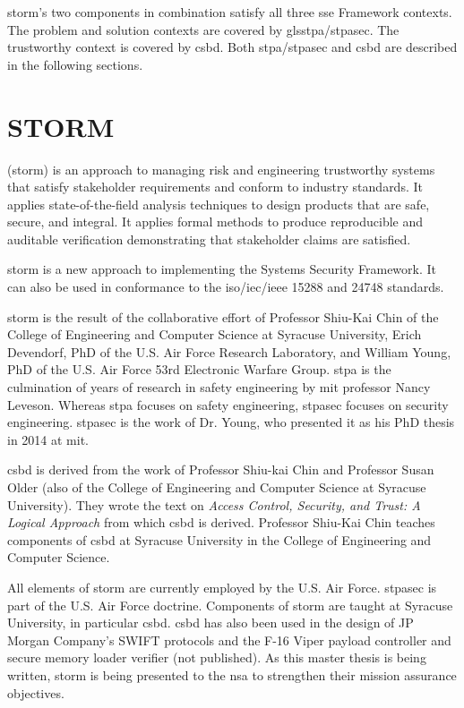 \documentclass[../../main/main.tex]{subfiles}
\begin{document}
\gls{storm}'s two components in combination satisfy all three \gls{sse} Framework contexts.  The problem and solution contexts are covered by gls{stpa}/\gls{stpasec}.  The trustworthy context is covered by \gls{csbd}.  Both \gls{stpa}/\gls{stpasec} and \gls{csbd} are described in the following sections.


\section{STORM}\label{sec:storm}

 (\gls{storm}) is an approach to managing risk and engineering trustworthy systems that satisfy stakeholder requirements and conform to industry standards.  It applies state-of-the-field analysis techniques to design products that are safe, secure, and integral.  It applies formal methods to produce reproducible and auditable verification demonstrating that stakeholder claims are satisfied.  


\gls{storm} is a new approach to implementing the Systems Security Framework.  It can also be used in conformance to the \gls{iso}/\gls{iec}/\gls{ieee} 15288 and 24748 standards.  

\gls{storm} is the result of the collaborative effort of Professor Shiu-Kai Chin of the College of Engineering and Computer Science at Syracuse University, Erich Devendorf, PhD of the U.S. Air Force Research Laboratory, and William Young, PhD of the U.S. Air Force 53rd Electronic Warfare Group.  \gls{stpa} is the culmination of years of research in safety engineering by \Gls{mit} professor Nancy Leveson.  Whereas \gls{stpa} focuses on safety engineering, \gls{stpasec} focuses on security engineering.  \gls{stpasec} is the work of Dr. Young, who presented it as his PhD thesis in 2014 at \gls{mit}.  

\gls{csbd} is derived from the work of Professor Shiu-kai Chin and Professor Susan Older (also of the College of Engineering and Computer Science at Syracuse University).  They wrote the text on \textit{Access Control, Security, and Trust: A Logical Approach} \cite{ChinOlder} from which \gls{csbd} is derived.  Professor Shiu-Kai Chin teaches components of \gls{csbd} at Syracuse University in the College of Engineering and Computer Science.  


All elements of \gls{storm} are currently employed by the U.S. Air Force. \gls{stpasec} is part of the U.S. Air Force doctrine. Components of \gls{storm} are taught at Syracuse University, in particular \gls{csbd}. \gls{csbd} has also been used in the design of JP Morgan Company's SWIFT protocols \cite{pkm} and the F-16 Viper payload controller and secure memory loader verifier (not published). As this master thesis is being written, \gls{storm} is being presented to the \gls{nsa} to strengthen their mission assurance objectives.
\end{document}
